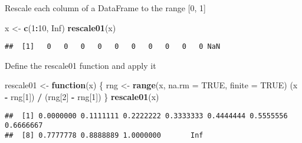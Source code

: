 \documentclass[
]{article}
\newenvironment{Shaded}{\begin{snugshade}}{\end{snugshade}}
\newcommand{\AttributeTok}[1]{\textcolor[rgb]{0.13,0.29,0.53}{#1}}
\newcommand{\ConstantTok}[1]{\textcolor[rgb]{0.56,0.35,0.01}{#1}}
\newcommand{\ControlFlowTok}[1]{\textcolor[rgb]{0.13,0.29,0.53}{\textbf{#1}}}
\newcommand{\DecValTok}[1]{\textcolor[rgb]{0.00,0.00,0.81}{#1}}
\newcommand{\FunctionTok}[1]{\textcolor[rgb]{0.13,0.29,0.53}{\textbf{#1}}}
\newcommand{\NormalTok}[1]{#1}
\newcommand{\OtherTok}[1]{\textcolor[rgb]{0.56,0.35,0.01}{#1}}
\newcommand{\SpecialCharTok}[1]{\textcolor[rgb]{0.81,0.36,0.00}{\textbf{#1}}}
\begin{document}
Rescale each column of a DataFrame to the range {[}0, 1{]}

\begin{Shaded}
\end{Shaded}

\begin{Shaded}
\begin{Highlighting}[]
\NormalTok{x }\OtherTok{\textless{}{-}} \FunctionTok{c}\NormalTok{(}\DecValTok{1}\SpecialCharTok{:}\DecValTok{10}\NormalTok{, }\ConstantTok{Inf}\NormalTok{)}
\FunctionTok{rescale01}\NormalTok{(x)}
\end{Highlighting}
\end{Shaded}

\begin{verbatim}
##  [1]   0   0   0   0   0   0   0   0   0   0 NaN
\end{verbatim}

Define the rescale01 function and apply it

\begin{Shaded}
\begin{Highlighting}[]
\NormalTok{rescale01 }\OtherTok{\textless{}{-}} \ControlFlowTok{function}\NormalTok{(x) \{}
\NormalTok{  rng }\OtherTok{\textless{}{-}} \FunctionTok{range}\NormalTok{(x, }\AttributeTok{na.rm =} \ConstantTok{TRUE}\NormalTok{, }\AttributeTok{finite =} \ConstantTok{TRUE}\NormalTok{)}
\NormalTok{  (x }\SpecialCharTok{{-}}\NormalTok{ rng[}\DecValTok{1}\NormalTok{]) }\SpecialCharTok{/}\NormalTok{ (rng[}\DecValTok{2}\NormalTok{] }\SpecialCharTok{{-}}\NormalTok{ rng[}\DecValTok{1}\NormalTok{])}
\NormalTok{\}}
\FunctionTok{rescale01}\NormalTok{(x)}
\end{Highlighting}
\end{Shaded}

\begin{verbatim}
##  [1] 0.0000000 0.1111111 0.2222222 0.3333333 0.4444444 0.5555556 0.6666667
##  [8] 0.7777778 0.8888889 1.0000000       Inf
\end{verbatim}
\end{document}
